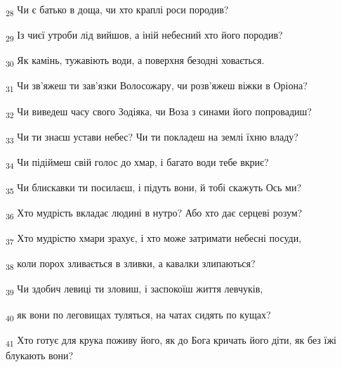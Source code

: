 \begin{tcolorbox}
\textsubscript{28} Чи є батько в доща, чи хто краплі роси породив?
\end{tcolorbox}
\begin{tcolorbox}
\textsubscript{29} Із чиєї утроби лід вийшов, а іній небесний хто його породив?
\end{tcolorbox}
\begin{tcolorbox}
\textsubscript{30} Як камінь, тужавіють води, а поверхня безодні ховається.
\end{tcolorbox}
\begin{tcolorbox}
\textsubscript{31} Чи зв'яжеш ти зав'язки Волосожару, чи розв'яжеш віжки в Оріона?
\end{tcolorbox}
\begin{tcolorbox}
\textsubscript{32} Чи виведеш часу свого Зодіяка, чи Воза з синами його попровадиш?
\end{tcolorbox}
\begin{tcolorbox}
\textsubscript{33} Чи ти знаєш устави небес? Чи ти покладеш на землі їхню владу?
\end{tcolorbox}
\begin{tcolorbox}
\textsubscript{34} Чи підіймеш свій голос до хмар, і багато води тебе вкриє?
\end{tcolorbox}
\begin{tcolorbox}
\textsubscript{35} Чи блискавки ти посилаєш, і підуть вони, й тобі скажуть Ось ми?
\end{tcolorbox}
\begin{tcolorbox}
\textsubscript{36} Хто мудрість вкладає людині в нутро? Або хто дає серцеві розум?
\end{tcolorbox}
\begin{tcolorbox}
\textsubscript{37} Хто мудрістю хмари зрахує, і хто може затримати небесні посуди,
\end{tcolorbox}
\begin{tcolorbox}
\textsubscript{38} коли порох зливається в зливки, а кавалки злипаються?
\end{tcolorbox}
\begin{tcolorbox}
\textsubscript{39} Чи здобич левиці ти зловиш, і заспокоїш життя левчуків,
\end{tcolorbox}
\begin{tcolorbox}
\textsubscript{40} як вони по леговищах туляться, на чатах сидять по кущах?
\end{tcolorbox}
\begin{tcolorbox}
\textsubscript{41} Хто готує для крука поживу його, як до Бога кричать його діти, як без їжі блукають вони?
\end{tcolorbox}
